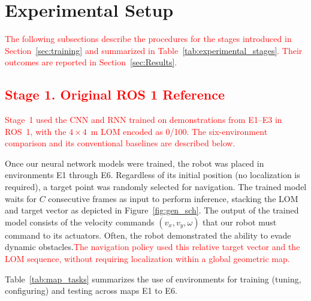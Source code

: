 \documentclass[robotics,article,submit,pdftex,moreauthors]{Definitions/mdpi}
\begin{document}


\endgroup

\section{Experimental Setup}\label{sec:Experiments}

\textcolor{red}{The following subsections describe the procedures for the stages introduced in Section~\ref{sec:training} and summarized in Table~\ref{tab:experimental_stages}. Their outcomes are reported in Section~\ref{sec:Results}.}

\subsection{\texorpdfstring{\textcolor{red}{Stage 1. Original ROS 1 Reference}}{Stage 1. Original ROS 1 Reference}}\label{subsec:stage1_setup}

\textcolor{red}{Stage~1 used the CNN and RNN trained on demonstrations from E1--E3 in ROS~1, with the $4\times4$~m LOM encoded as 0/100. The six-environment comparison and its conventional baselines are described below.}



Once our neural network models were trained, the robot was placed in environments E1 through E6. Regardless of its initial position (no localization is required), a target point was randomly selected for navigation. The trained model waits for $C$ consecutive frames as input to perform inference, stacking the LOM and target vector as depicted in Figure~\ref{fig:gen_sch}. The output of the trained model consists of the velocity commands $(v_x, v_y, \omega)$ that our robot must command to its actuators. Often, the robot demonstrated the ability to evade dynamic obstacles.\textcolor{red}{The navigation policy used this relative target vector and the LOM sequence, without requiring localization within a global geometric map.}

Table~\ref{tab:map_tasks} summarizes the use of environments for training (tuning, configuring) and testing across maps E1 to E6.
\end{document}
